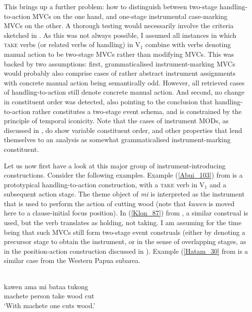 This brings up a further problem: how to distinguish between two-stage han\-dling-to-action MVCs on the one hand, and one-stage instrumental case-marking MVCs on the other. A thorough testing would necessarily involve the criteria sketched in . As this was not always possible, I assumed all instances in which \textsc{take} verbs (or related verbs of handling) in V$_1$ combine with verbs denoting manual action to be two-stage MVCs rather than modifying MVCs. This was backed by two assumptions: first, grammaticalised instrument-marking MVCs would probably also comprise cases of rather abstract instrument assignments with concrete manual action being semantically odd. However, all retrieved cases of handling-to-action still denote concrete manual action. And second, no change in constituent order was detected, also pointing to the conclusion that handling-to-action rather constitutes a two-stage event schema, and is constrained by the principle of temporal iconicity. Note that the cases of instrument MODs, as discussed in , do show variable constituent order, and other properties that lend themselves to an analysis as somewhat grammaticalised instrument-marking constituent.

Let us now first have a look at this major group of instrument-introducing constructions. Consider the following examples. Example (\ref{Abui_103}) from  is a prototypical handling-to-action construction, with a \textsc{take} verb in V$_1$ and a subsequent action stage. The theme object of \textit{mi} is interpreted as the instrument that is used to perform the action of cutting wood (note that \textit{kawen} is moved here to a clause-initial focus position). In (\ref{Klon_87}) from , a similar construal is used, but the verb translates as holding, not taking. I am assuming for the time being that such MVCs still form two-stage event construals (either by denoting a precursor stage to obtain the instrument, or in the sense of overlapping stages, as in the position-action construction discussed in ). Example (\ref{Hatam_30} from  is a similar case from the Western Papua subarea.

\ea \label{Abui_103}
\\
\gll kawen ama mi bataa tukong \\
machete person take wood cut \\
\glft `With machete one cuts wood.'\\ 
\z


